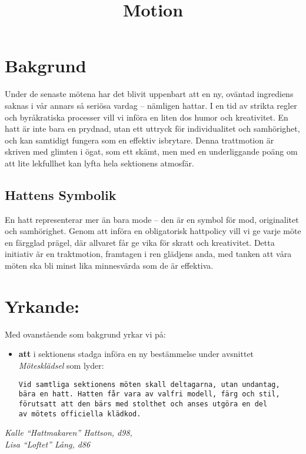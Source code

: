 \documentclass[a4paper]{dtekmotion}
\title{Motion}
\begin{document}
\maketitle

\section{Bakgrund}
Under de senaste mötena har det blivit uppenbart att en ny, oväntad ingrediens saknas i vår annars så seriösa vardag – nämligen hattar. I en tid av strikta regler och byråkratiska processer vill vi införa en liten dos humor och kreativitet. En hatt är inte bara en prydnad, utan ett uttryck för individualitet och samhörighet, och kan samtidigt fungera som en effektiv isbrytare. Denna trattmotion är skriven med glimten i ögat, som ett skämt, men med en underliggande poäng om att lite lekfullhet kan lyfta hela sektionens atmosfär.

\subsection*{Hattens Symbolik}
En hatt representerar mer än bara mode – den är en symbol för mod, originalitet och samhörighet. Genom att införa en obligatorisk hattpolicy vill vi ge varje möte en färgglad prägel, där allvaret får ge vika för skratt och kreativitet. Detta initiativ är en traktmotion, framtagen i ren glädjens anda, med tanken att våra möten ska bli minst lika minnesvärda som de är effektiva.

\section{Yrkande:}
Med ovanstående som bakgrund yrkar vi på: 

\begin{itemize}

\item \textbf{att} i sektionens stadga införa en ny bestämmelse under avsnittet \textit{Mötesklädsel} som lyder:
\begin{verbatim}
Vid samtliga sektionens möten skall deltagarna, utan undantag,
bära en hatt. Hatten får vara av valfri modell, färg och stil,
förutsatt att den bärs med stolthet och anses utgöra en del
av mötets officiella klädkod.
\end{verbatim}

\end{itemize}

\textit{Kalle \enquote{Hattmakaren} Hattson, d98,\\}
\textit{Lisa \enquote{Loftet} Lång, d86}
\end{document}
